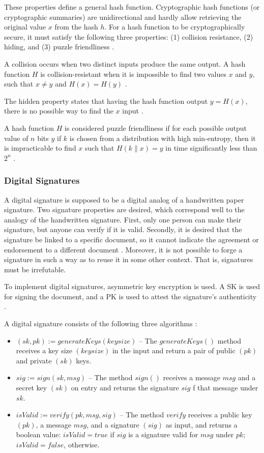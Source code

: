 These properties define a general hash function. Cryptographic hash functions (or cryptographic summaries) are unidirectional and hardly allow retrieving the original value $x$ from the hash $h$. For a hash function to be cryptographically secure, it must satisfy the following three properties: (1) collision resistance, (2) hiding, and (3) puzzle friendliness \cite{greve2018blockchain}.

A collision occurs when two distinct inputs produce the same output. A hash function $H$ is collision-resistant when it is impossible to find two values $x$ and $y$, such that $x \neq y$ and $H(x) = H(y)$ \cite{narayanan2016bitcoin}.

The hidden property states that having the hash function output $y = H (x)$, there is no possible way to find the $x$ input \cite{greve2018blockchain}.

A hash function $H$ is considered puzzle friendliness if for each possible output value of $n$ bits $y$ if $k$ is chosen from a distribution with high min-entropy, then it is impracticable to find $x$ such that $H (k \| x) = y$ in time significantly less than $2^n$ \cite{narayanan2016bitcoin}.

\subsubsection{Digital Signatures}\label{sec:assinaturasDigitais}
A digital signature is supposed to be a digital analog of a handwritten paper signature. Two signature properties are desired, which correspond well to the analogy of the handwritten signature. First, only one person can make their signature, but anyone can verify if it is valid. Secondly, it is desired that the signature be linked to a specific document, so it cannot indicate the agreement or endorsement to a different document \cite{merkle1989certified}. Moreover, it is not possible to forge a signature in such a way as to reuse it in some other context. That is, signatures must be irrefutable.

To implement digital signatures, asymmetric key encryption is used. A \ac{SK} is used for signing the document, and a \ac{PK} is used to attest the signature's authenticity \cite{greve2018blockchain}.

A digital signature consists of the following three algorithms \cite{narayanan2016bitcoin}:

\begin{itemize}
\item $(sk , pk) := generateKeys(keysize)$ – The $generateKeys()$ method receives a key size $(keysize)$ in the input and return a pair of public $(pk)$ and private $(sk)$ keys.
\item $sig := sign(sk , msg)$ – The method $sign()$ receives a message $msg$ and a secret key $(sk)$ on entry and returns the signature $sig$ f that message under $sk$.
\item $isValid := verify(pk , msg , sig)$ – The method $verify$ receives a public key $(pk)$, a message $msg$, and a signature $(sig)$ as input, and returns a boolean value: $isValid = true$ if $sig$ is a signature valid for $msg$ under $pk$; $isValid = false$, otherwise.
\end{itemize}

